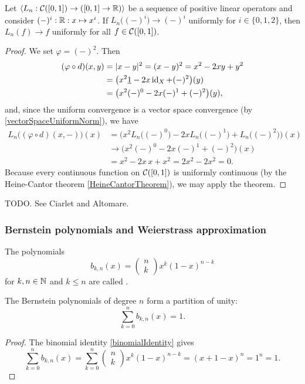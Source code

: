\begin{corollary} \label{BohmanKorovkin}
Let $\seq{L_n: \cont(\interval{0,1})\to (\interval{0,1}\to \R)}$ be a sequence of positive linear operators and consider $(-)^i: \interval[0,1] \to \R: x\mapsto x^i$. If $L_n\big((-)^i\big) \to (-)^i$ uniformly for $i\in\{0,1,2\}$, then $L_n(f) \to f$ uniformly for all $f\in\cont(\interval{0,1})$.
\end{corollary}
\begin{proof}
We set $\varphi = (-)^2$. Then
\begin{align*}
(\varphi\circ d)(x,y) &= |x-y|^2 = (x-y)^2 = x^2 -2xy +y^2 \\
&= \big(x^2\underline{1} - 2x\operatorname{id}_X + (-)^2\big)(y) \\
&= \big(x^2(-)^0 - 2x(-)^1 + (-)^2\big)(y),
\end{align*}
and, since the uniform convergence is a vector space convergence (by \ref{vectorSpaceUniformNorm}), we have
\begin{align*}
L_n\big((\varphi\circ d)(x,-)\big)(x) &= \Big(x^2L_n\big((-)^0\big) - 2xL_n\big((-)^1\big) + L_n\big((-)^2\big)\Big)(x) \\
&\to \Big(x^2(-)^0 - 2x(-)^1 + (-)^2\Big)(x) \\
&= x^2 - 2x\, x + x^2 = 2x^2 - 2x^2 = 0.
\end{align*}
Because every continuous function on $\cont(\interval{0,1})$ is uniformly continuous (by the Heine-Cantor theorem \ref{HeineCantorTheorem}), we may apply the theorem.
\end{proof}
\begin{corollary}
TODO. See Ciarlet and Altomare.
\end{corollary}

\subsubsection{Bernstein polynomials and Weierstrass approximation}
\begin{definition}
The polynomials
\[ b_{k,n}(x) = \begin{pmatrix}
n \\ k
\end{pmatrix}x^k(1-x)^{n-k} \]
for $k,n\in \mathbb{N}$ and $k\leq n$ are called .
\end{definition}

\begin{lemma} \label{BernsteinPartitionUnity}
The Bernstein polynomials of degree $n$ form a partition of unity:
\[ \sum_{k=0}^n b_{k,n}(x) = 1. \]
\end{lemma}
\begin{proof}
The binomial identity \ref{binomialIdentity} gives
\[ \sum_{k=0}^n b_{k,n}(x) = \sum_{k=0}^n \begin{pmatrix}
n \\ k
\end{pmatrix}x^k(1-x)^{n-k} = (x+1-x)^n = 1^n = 1. \]
\end{proof}

